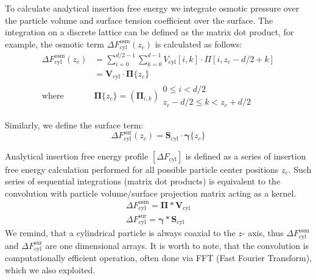 \documentclass[10pt, a4paper]{article}
\begin{document}
\begin{multicols}{2}
To calculate analytical insertion free energy we integrate osmotic pressure over the particle volume and surface tension coefficient over the surface.
The integration on a discrete lattice can be defined as the matrix dot product, for example, the osmotic term $\Delta F_{\textrm{cyl}}^{\textrm{osm}}(z_c)$ is calculated as follows:
\begin{equation}\label{eq:cyl_fe_osm}
    \begin{split}
        \Delta F_{\textrm{cyl}}^{\textrm{osm}}(z_c) &= \sum_{i=0}^{d/2-1} \sum_{k=0}^{d-1} V_{\textrm{cyl}}[i, k] \cdot \Pi[i, z_c-d/2+k] 
        \\   &= \mathbf{V}_{\textrm{cyl}} \cdot  \bm{\Pi}\{z_c\}
        \\ \text{where } &\bm{\Pi}\{z_c\} =\left(\bm{\Pi}_{i,k}\right) {\substack{0 \le i < d/2 \\ z_c-d/2 \le k < z_c+d/2}}
    \end{split}
\end{equation} 

Similarly, we define the surface term:
\begin{equation}\label{eq:cyl_fe_sur}
    \Delta F_{\textrm{cyl}}^{\textrm{sur}}(z_c) = \mathbf{S}_{\textrm{cyl}} \cdot  \bm{\gamma}\{z_c\}
\end{equation}

Analytical insertion free energy profile $\left[\Delta F_{\textrm{cyl}}\right]$ is defined as a series of insertion free energy calculation performed for all possible particle center positions $z_c$.
Such series of sequential integrations (matrix dot products) is equivalent to the convolution with particle volume/surface projection matrix acting as a kernel.
\begin{eqnarray}
    \Delta F_{\textrm{cyl}}^{\textrm{osm}} = \mathbf{\Pi} \ast \mathbf{V}_{\textrm{cyl}}
    \\
    \Delta F_{\textrm{cyl}}^{\textrm{sur}} = \bm{\gamma} \ast \mathbf{S}_{\textrm{cyl}}
\end{eqnarray}
We remind, that a cylindrical particle is always coaxial to the $z$- axis, thus $\Delta F_{\textrm{cyl}}^{\textrm{osm}}$ and  $\Delta F_{\textrm{cyl}}^{\textrm{sur}}$ are one dimensional arrays.
It is worth to note, that the convolution is computationally efficient operation, often done via FFT (Fast Fourier Transform), which we also exploited.


\end{multicols}

\end{document}
